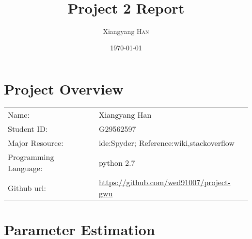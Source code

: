 \documentclass{article}
\title{Project 2 Report} %
\author{Xiangyang \textsc{Han}} %
\date{\today} %
\begin{document}
\maketitle %



\section{Project Overview}


\begin{tabular}{ll}
Name:&Xiangyang Han\\
Student ID:&G29562597\\
Major Resource:&ide:Spyder; Reference:wiki,stackoverflow\\
Programming Language:&python 2.7\\
Github url:&\url{https://github.com/wed91007/project-gwu}
\end{tabular}




 

\section{Parameter Estimation}
\end{document}
